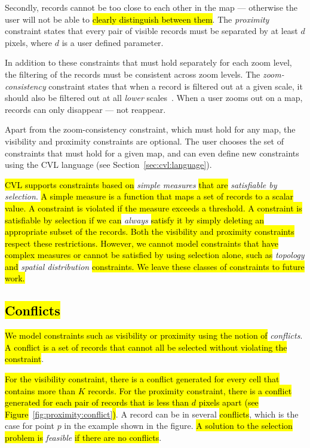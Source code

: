 Secondly, records cannot be too close to each other in the map --- otherwise the user will not be able to \hl{clearly distinguish between them}. The \emph{proximity} constraint states that every pair of visible records must be separated by at least $d$ pixels, where $d$ is a user defined parameter.

In addition to these constraints that must hold separately for each zoom level, the filtering of the records must be consistent across zoom levels. The \emph{zoom-consistency} constraint states that when a record is filtered out at a given scale, it should also be filtered out at all \emph{lower} scales~\cite{sarma2012fusiontables}. When a user zooms out on a map, records can only disappear --- not reappear.

Apart from the zoom-consistency constraint, which must hold for any map, the visibility and proximity constraints are optional. The user chooses the set of constraints that must hold for a given map, and can even define new constraints using the CVL language (see Section~\ref{sec:cvl:language}).

\hl{CVL supports constraints based on }\emph{simple measures}\hl{ that are }\emph{satisfiable by selection}.\hl{ A simple measure is a function that maps a set of records to a scalar value. A constraint is violated if the measure exceeds a threshold. A constraint is satisfiable by selection if we can }\emph{always}\hl{ satisfy it by simply deleting an appropriate subset of the records. Both the visibility and proximity constraints respect these restrictions. However, we cannot model constraints that have complex measures or cannot be satisfied by using selection alone, such as }\emph{topology}\hl{ and }\emph{spatial distribution}\hl{ constraints. We leave these classes of constraints to future work.}

\subsection{\hl{Conflicts}}
\label{sec:conflicts}

\hl{We model constraints such as visibility or proximity using the notion of }\emph{conflicts}. \hl{A conflict is a set of records that cannot all be selected without violating the constraint}.

\hl{For the visibility constraint, there is a conflict generated for every cell that contains more than $K$ records. For the proximity constraint, there is a conflict generated for each pair of records that is less than $d$ pixels apart (see Figure}~\ref{fig:proximity:conflict}\hl{)}. A record can be in several \hl{conflicts}, which is the case for point $p$ in the example shown in the figure. \hl{A solution to the selection problem is }\emph{feasible}\hl{ if there are no conflicts}.

